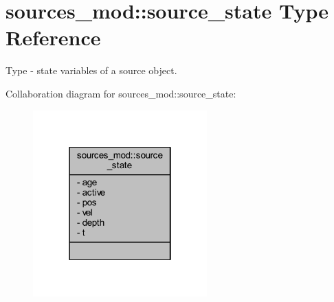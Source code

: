 \hypertarget{structsources__mod_1_1source__state}{}\section{sources\+\_\+mod\+:\+:source\+\_\+state Type Reference}
\label{structsources__mod_1_1source__state}


Type -\/ state variables of a source object.  




Collaboration diagram for sources\+\_\+mod\+:\+:source\+\_\+state\+:\nopagebreak
\begin{figure}[H]
\begin{center}
\leavevmode
\includegraphics[width=190pt]{structsources__mod_1_1source__state__coll__graph}
\end{center}
\end{figure}
